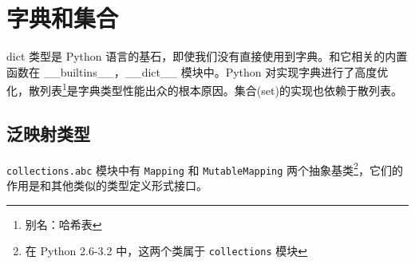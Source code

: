 \section{字典和集合}

dict 类型是 Python 语言的基石，即使我们没有直接使用到字典。和它相关的内置函数在 \_\_builtins\_\_，\_\_dict\_\_ 模块中。Python 对实现字典进行了高度优化，散列表\footnote{别名：哈希表}是字典类型性能出众的根本原因。集合(set)的实现也依赖于散列表。

\subsection{泛映射类型}

\texttt{collections.abc} 模块中有 \texttt{Mapping} 和 \texttt{MutableMapping} 两个抽象基类\footnote{在 Python 2.6-3.2 中，这两个类属于 \texttt{collections} 模块}，它们的作用是和其他类似的类型定义形式接口。

